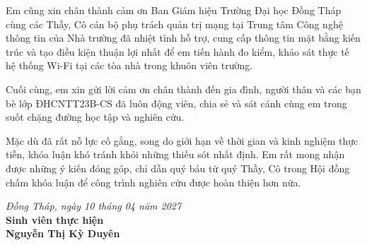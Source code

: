 Em cũng xin chân thành cảm ơn Ban Giám hiệu Trường Đại học Đồng Tháp cùng các Thầy, Cô cán bộ phụ trách quản trị mạng tại Trung tâm Công nghệ thông tin của Nhà trường đã nhiệt tình hỗ trợ, cung cấp thông tin mặt bằng kiến trúc và tạo điều kiện thuận lợi nhất để em tiến hành đo kiểm, khảo sát thực tế hệ thống Wi-Fi tại các tòa nhà trong khuôn viên trường.

Cuối cùng, em xin gửi lời cảm ơn chân thành đến gia đình, người thân và các bạn bè lớp ĐHCNTT23B-CS đã luôn động viên, chia sẻ và sát cánh cùng em trong suốt chặng đường học tập và nghiên cứu.

Mặc dù đã rất nỗ lực cố gắng, song do giới hạn về thời gian và kinh nghiệm thực tiễn, khóa luận khó tránh khỏi những thiếu sót nhất định. Em rất mong nhận được những ý kiến đóng góp, chỉ dẫn quý báu từ quý Thầy, Cô trong Hội đồng chấm khóa luận để công trình nghiên cứu được hoàn thiện hơn nữa.

\vspace{1.5cm}
\begin{flushright}
  \textit{Đồng Tháp, ngày 10 tháng 04 năm 2027}\\
  \textbf{Sinh viên thực hiện}\\[2.5cm]
  \textbf{Nguyễn Thị Kỳ Duyên}
\end{flushright}
